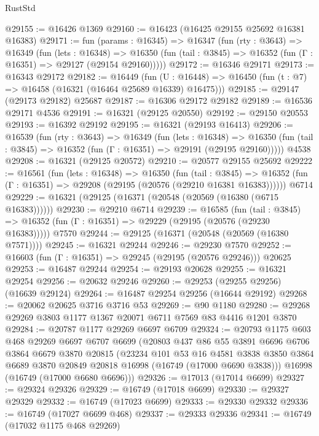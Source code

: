 \begin{lexlean}{RustStd}
\begin{coremodule}
@29155 := @16426 @1369
@29160 := @16423 (@16425 @29155 @25692 @16381 @16383)
@29171 := fun (params : @16345) =>
  @16347
    (fun (rty : @3643) =>
    @16349
      (fun (lets : @16348) =>
      @16350 (fun (tail : @3845) => @16352 (fun (Γ : @16351) => @29127 (@29154 @29160)))))
@29172 := @16346 @29171
@29173 := @16343 @29172
@29182 := @16449
    (fun (U : @16448) => @16450 (fun (t : @7) => @16458 (@16321 (@16464 @25689 @16339) @16475)))
@29185 := @29147 (@29173 @29182) @25687
@29187 := @16306 @29172 @29182
@29189 := @16536 @29171 @4536
@29191 := @16321 (@29125 @20550)
@29192 := @29150 @20553
@29193 := @16392 @29192
@29195 := @16321 (@29193 @16413)
@29206 := @16539
    (fun (rty : @3643) =>
    @16349
      (fun (lets : @16348) =>
      @16350 (fun (tail : @3845) => @16352 (fun (Γ : @16351) => @29191 (@29195 @29160)))))
    @4538
@29208 := @16321 (@29125 @20572)
@29210 := @20577 @29155 @25692
@29222 := @16561
    (fun (lets : @16348) =>
    @16350
      (fun (tail : @3845) =>
      @16352 (fun (Γ : @16351) => @29208 (@29195 (@20576 (@29210 @16381 @16383))))))
    @6714
@29229 := @16321 (@29125 (@16371 (@20548 (@20569 (@16380 (@6715 @16383))))))
@29230 := @29210 @6714
@29239 := @16585
    (fun (tail : @3845) => @16352 (fun (Γ : @16351) => @29229 (@29195 (@20576 (@29230 @16383)))))
    @7570
@29244 := @29125 (@16371 (@20548 (@20569 (@16380 @7571))))
@29245 := @16321 @29244
@29246 := @29230 @7570
@29252 := @16603 (fun (Γ : @16351) => @29245 (@29195 (@20576 @29246))) @20625
@29253 := @16487 @29244
@29254 := @29193 @20628
@29255 := @16321 @29254
@29256 := @20632 @29246
@29260 := @29253 (@29255 @29256) (@16639 @29124)
@29264 := @16487 @29254 @29256 (@16644 @29192)
@29268 := @20062 @20625 @3716 @3716 @53
@29269 := @90 @1180
@29280 := @29268 @29269 @3803 @1177 @1367 @20071 @6711 @7569 @83 @4416 @1201 @3870
@29284 := @20787 @1177 @29269 @6697 @6709
@29324 := @20793
    @1175
    @603
    @468
    @29269
    @6697
    @6707
    @6699
    (@20803
      @437
      @86
      @55
      @3891
      @6696
      @6706
      @3864
      @6679
      @3870
      @20815
      (@23234
        @101
        @53
        @16
        @4581
        @3838
        @3850
        @3864
        @6689
        @3870
        @20849
        @20818
        @16998
        (@16749 (@17000 @6690 @3838)))
      @16998
      (@16749 (@17000 @6680 @6696)))
@29326 := @17013 (@17014 @6699)
@29327 := @29324 @29326
@29329 := @16749 (@17018 @6699)
@29330 := @29327 @29329
@29332 := @16749 (@17023 @6699)
@29333 := @29330 @29332
@29336 := @16749 (@17027 @6699 @468)
@29337 := @29333 @29336
@29341 := @16749 (@17032 @1175 @468 @29269)

\end{coremodule}
\end{lexlean}
